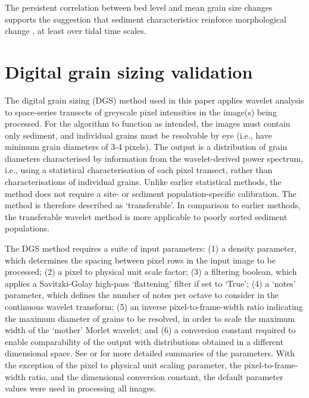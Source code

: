 \documentclass[preprint,12pt,authoryear]{elsarticle}
\begin{document}
The persistent correlation between bed level and mean grain size changes supports the suggestion that sediment characteristics reinforce morphological change \citep[see][]{Buscombe_Masselink2006}, at least over tidal time scales.








\appendix

\section{Digital grain sizing validation}\label{Appendix}

The \citet{Buscombe2013} digital grain sizing (DGS) method used in this paper applies wavelet analysis to space-series transects of greyscale pixel intensities in the image(s) being processed. For the algorithm to function as intended, the images must contain only sediment, and individual grains must be resolvable by eye (i.e., have minimum grain diameters of 3-4 pixels). The output is a distribution of grain diameters characterised by information from the wavelet-derived power spectrum, i.e., using a statistical characterisation of each pixel transect, rather than characterisations of individual grains. Unlike earlier statistical methods, the \citet{Buscombe2013} method does not require a site- or sediment population-specific calibration. The method is therefore described as `transferable'. In comparison to earlier methods, the transferable wavelet method is more applicable to poorly sorted sediment populations.

The DGS method requires a suite of input parameters: (1) a density parameter, which determines the spacing between pixel rows in the input image to be processed; (2) a pixel to physical unit scale factor; (3) a filtering boolean, which applies a Savitzki-Golay high-pass `flattening' filter if set to `True'; (4) a `notes' parameter, which defines the number of notes per octave to consider in the continuous wavelet transform; (5) an inverse pixel-to-frame-width ratio indicating the maximum diameter of grains to be resolved, in order to scale the maximum width of the `mother' Morlet wavelet; and (6) a conversion constant required to enable comparability of the output with distributions obtained in a different dimensional space. See \citet{Buscombe2013} or \citet{Cuttler_etal2017} for more detailed summaries of the parameters. With the exception of the pixel to physical unit scaling parameter, the pixel-to-frame-width ratio, and the dimensional conversion constant, the default parameter values were used in processing all images.
\end{document}
